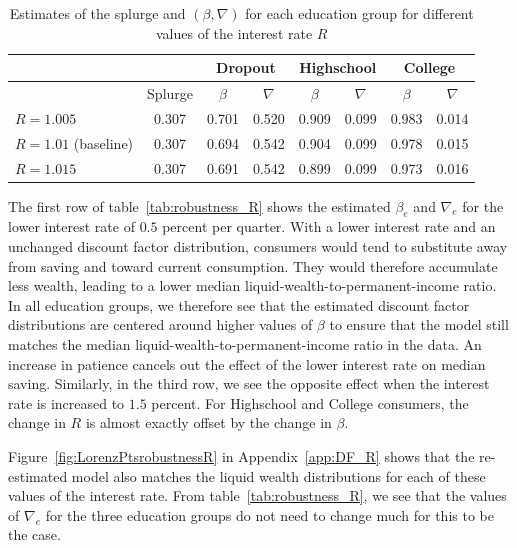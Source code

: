 \documentclass[\econtexRoot/HAFiscal]{subfiles}
\begin{document}
\begin{table}[t]
  \begin{center}
    \begin{tabular}{lc|cccccc} 
      \toprule
      & & \multicolumn{2}{c}{Dropout} & \multicolumn{2}{c}{Highschool} & \multicolumn{2}{c}{College} \\ \midrule 
      & Splurge & $\beta$ & $\nabla$ & $\beta$ & $\nabla$ & $\beta$ & $\nabla$ \\ \midrule 
      $R = 1.005$ & 0.307 & 0.701 & 0.520 & 0.909 & 0.099 & 0.983 & 0.014 \\
      $R = 1.01$ (baseline) & 0.307 & 0.694 & 0.542 & 0.904 & 0.099 & 0.978 & 0.015 \\ 
      $R = 1.015$ & 0.307 & 0.691 & 0.542 & 0.899 & 0.099 & 0.973 & 0.016 
      \\ \bottomrule 
    \end{tabular}
    \caption{Estimates of the splurge and $(\beta,\nabla)$ for each education group for different values of the interest rate $R$}
    \notinsubfile{\label{tab:robustness_R}}
  \end{center}
\end{table}

The first row of table~\ref{tab:robustness_R} shows the estimated $\beta_e$ and $\nabla_e$ for the lower interest rate of $0.5$ percent per quarter. With a lower interest rate and an unchanged discount factor distribution, consumers would tend to substitute away from saving and toward current consumption. They would therefore accumulate less wealth, leading to a lower median liquid-wealth-to-permanent-income ratio. In all education groups, we therefore see that the estimated discount factor distributions are centered around higher values of $\beta$ to ensure that the model still matches the median liquid-wealth-to-permanent-income ratio in the data. An increase in patience cancels out the effect of the lower interest rate on median saving. Similarly, in the third row, we see the opposite effect when the interest rate is increased to $1.5$ percent. For Highschool and College consumers, the change in $R$ is almost exactly offset by the change in $\beta$.  

Figure~\ref{fig:LorenzPtsrobustnessR} in Appendix~\ref{app:DF_R} shows that the re-estimated model also matches the liquid wealth distributions for each of these values of the interest rate. From table~\ref{tab:robustness_R}, we see that the values of $\nabla_e$ for the three education groups do not need to change much for this to be the case. 
\end{document}
